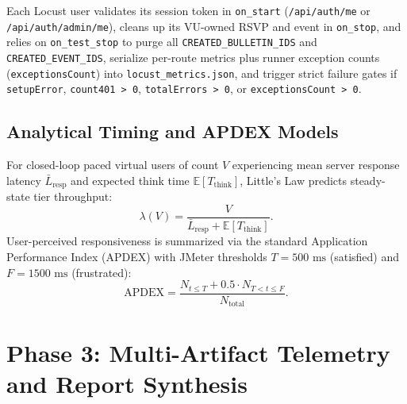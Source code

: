 \documentclass[11pt,letterpaper]{article}
\begin{document}
Each Locust user validates its session token in \texttt{on\_start} (\texttt{/api/auth/me} or \texttt{/api/auth/admin/me}), cleans up its VU-owned RSVP and event in \texttt{on\_stop}, and relies on \texttt{on\_test\_stop} to purge all \texttt{CREATED\_BULLETIN\_IDS} and \texttt{CREATED\_EVENT\_IDS}, serialize per-route metrics plus runner exception counts (\texttt{exceptionsCount}) into \texttt{locust\_metrics.json}, and trigger strict failure gates if \texttt{setupError}, \texttt{count401 > 0}, \texttt{totalErrors > 0}, or \texttt{exceptionsCount > 0}.

\subsection{Analytical Timing and APDEX Models}
For closed-loop paced virtual users of count $V$ experiencing mean server response latency $\bar{L}_{\text{resp}}$ and expected think time $\mathbb{E}[T_{\text{think}}]$, Little's Law predicts steady-state tier throughput:
\begin{equation}
  \label{eq:little}
  \lambda(V) = \frac{V}{\bar{L}_{\text{resp}} + \mathbb{E}[T_{\text{think}}]}.
\end{equation}
User-perceived responsiveness is summarized via the standard Application Performance Index (APDEX) with JMeter thresholds $T = 500\text{ ms}$ (satisfied) and $F = 1500\text{ ms}$ (frustrated):
\begin{equation}
  \label{eq:apdex}
  \text{APDEX} = \frac{N_{t \le T} + 0.5 \cdot N_{T < t \le F}}{N_{\text{total}}}.
\end{equation}

\section{Phase 3: Multi-Artifact Telemetry and Report Synthesis}
\end{document}
